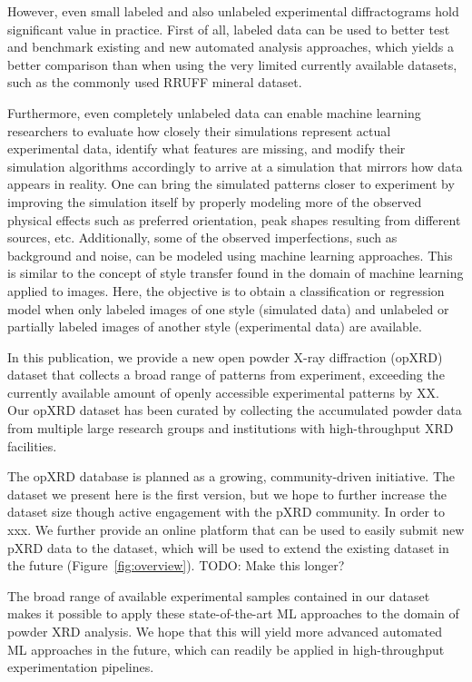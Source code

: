 However, even small labeled and also unlabeled experimental diffractograms hold significant value in practice. First of all, labeled data can be used to better test and benchmark existing and new automated analysis approaches, which yields a better comparison than when using the very limited currently available datasets, such as the commonly used RRUFF mineral dataset.

Furthermore, even completely unlabeled data can enable machine learning researchers to evaluate how closely their simulations represent actual experimental data, identify what features are missing, and modify their simulation algorithms accordingly to arrive at a simulation that mirrors how data appears in reality.
One can bring the simulated patterns closer to experiment by improving the simulation itself by properly modeling more of the observed physical effects such as preferred orientation, peak shapes resulting from different sources, etc.
Additionally, some of the observed imperfections, such as background and noise, can be modeled using machine learning approaches.
This is similar to the concept of style transfer\cite{Gatys2016,Ganin2015} found in the domain of machine learning applied to images.
Here, the objective is to obtain a classification or regression model when only labeled images of one style (simulated data) and unlabeled or partially labeled images of another style (experimental data) are available.

In this publication, we provide a new open powder X-ray diffraction (opXRD) dataset that collects a broad range of patterns from experiment, exceeding the currently available amount of openly accessible experimental patterns by XX.
Our opXRD dataset has been curated by collecting the accumulated powder data from multiple large research groups and institutions with high-throughput XRD facilities.

The opXRD database is planned as a growing, community-driven initiative. The dataset we present here is the first version, but we hope to further increase the dataset size though active engagement with the pXRD community. In order to xxx. We further provide an online platform that can be used to easily submit new pXRD data to the dataset, which will be used to extend the existing dataset in the future (Figure~\ref{fig:overview}).
TODO: Make this longer?





The broad range of available experimental samples contained in our dataset makes it possible to apply these state-of-the-art ML approaches to the domain of powder XRD analysis.
We hope that this will yield more advanced automated ML approaches in the future, which can readily be applied in high-throughput experimentation pipelines.













